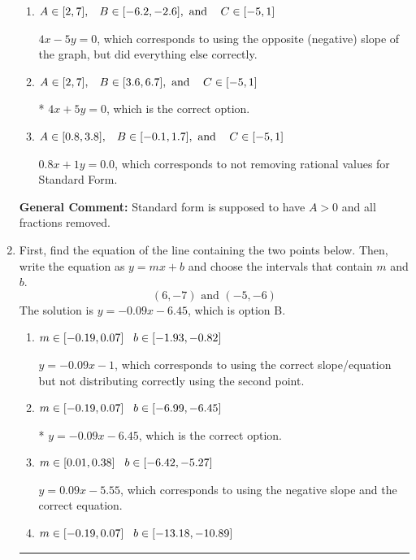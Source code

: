 \documentclass{extbook}[14pt]
\newcommand{\litem}[1]{\item #1

\rule{\textwidth}{0.4pt}}
\begin{document}
\begin{enumerate}
{\begin{enumerate}[label=\Alph*.]
 $0.8x - 1y = -0.0$, which corresponds to using the opposite (negative) slope of the graph and not removing rational values.
\item \( A \in [2, 7], \hspace{3mm} B \in [-6.2, -2.6], \text{ and } \hspace{3mm} C \in [-5, 1] \)

 $4x - 5y = 0$, which corresponds to using the opposite (negative) slope of the graph, but did everything else correctly.
\item \( A \in [2, 7], \hspace{3mm} B \in [3.6, 6.7], \text{ and } \hspace{3mm} C \in [-5, 1] \)

* $4x + 5y = 0$, which is the correct option.
\item \( A \in [0.8, 3.8], \hspace{3mm} B \in [-0.1, 1.7], \text{ and } \hspace{3mm} C \in [-5, 1] \)

 $0.8x + 1y = 0.0$, which corresponds to not removing rational values for Standard Form.
\end{enumerate}

\textbf{General Comment:} Standard form is supposed to have $A > 0$ and all fractions removed.
}
\litem{
First, find the equation of the line containing the two points below. Then, write the equation as $ y=mx+b $ and choose the intervals that contain $m$ and $b$.
\[ (6, -7) \text{ and } (-5, -6) \]
The solution is \( y = -0.09x -6.45 \), which is option B.\begin{enumerate}[label=\Alph*.]
\item \( m \in [-0.19, 0.07] \hspace*{3mm} b \in [-1.93, -0.82] \)

 $y = -0.09x -1$, which corresponds to using the correct slope/equation but not distributing correctly using the second point.
\item \( m \in [-0.19, 0.07] \hspace*{3mm} b \in [-6.99, -6.45] \)

* $y = -0.09x -6.45$, which is the correct option.
\item \( m \in [0.01, 0.38] \hspace*{3mm} b \in [-6.42, -5.27] \)

 $y = 0.09x -5.55$, which corresponds to using the negative slope and the correct equation.
\item \( m \in [-0.19, 0.07] \hspace*{3mm} b \in [-13.18, -10.89] \)


\end{enumerate}}
\end{enumerate}
\end{document}
